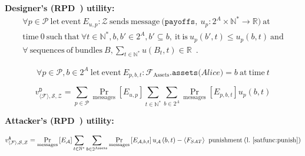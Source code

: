 \noindent \textbf{Designer's (RPD~\cite{rationalprotocol}) utility:}
\begin{gather*}
  \forall p \in \mathcal{P} \: \mathrm{let \: event} \: E_{u, p}: \mathcal{Z} \:
  \mathrm{sends \: message} \: \mathtt{(payoffs,} \: u_p:2^A \times \mathbb{N}^*
  \rightarrow \mathbb{R} \mathtt{)} \: \mathrm{at} \\
  \mathrm{time} \: 0 \: \mathrm{such \: that} \: \forall t \in \mathbb{N}^*, b, b' \in
  2^A, b' \subseteq b, \: \mathrm{it \: is} \: u_p\left(b', t\right) \leq u_p\left(b,
  t\right) \: \mathrm{and} \\
  \forall \: \mathrm{sequences \: of \: bundles} \: B, \sum\limits_{t \in
  \mathbb{N}^*}u\left(B_t, t\right) \in \mathbb{R}\enspace.
\end{gather*}

\begin{equation*}
  \forall p \in \mathcal{P}, b \in 2^A \: \mathrm{let \: event} \: E_{p, b, t}:
  \mathcal{F}_{\mathrm{Assets}}.\mathtt{assets(}Alice\mathtt{)} = b \: \mathrm{at \: time}
  \: t
\end{equation*}

\begin{equation*}
  v^{\mathtt{D}}_{\langle \mathcal{F} \rangle, \mathcal{S}, \mathcal{Z}} = \sum\limits_{p
  \in \mathcal{P}} \Pr\limits_{\mathrm{messages}}\left[E_{u, p}\right] \sum\limits_{t \in
  \mathbb{N}^*} \sum\limits_{b \in 2^A} \Pr\limits_{\mathrm{messages}}\left[E_{p, b,
  t}\right] u_p\left(b, t\right)
\end{equation*}

\noindent \textbf{Attacker's (RPD~\cite{rationalprotocol}) utility:}

\begin{equation*}
  v^{\mathtt{A}}_{\langle \mathcal{F} \rangle, \mathcal{S}, \mathcal{Z}} =
  \Pr\limits_{\mathrm{messages}}\left[E_\mathcal{A}\right] \sum\limits_{t \in
  \mathbb{N}^*} \sum\limits_{b \in 2^{\mathrm{Assets}}}
  \Pr\limits_{\mathrm{messages}}\left[E_{\mathcal{A}, b, t}\right] u_{\mathcal{A}}\left(b,
  t\right) - \langle F_{SAT} \rangle \: \mathrm{~punishment \: (l.~\ref{satfunc:punish})}
\end{equation*}

